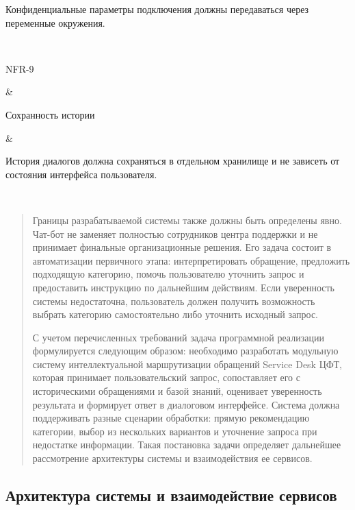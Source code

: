 \documentclass[
]{article}
\begin{document}
\begin{longtable}[]
\begin{minipage}[b]{\linewidth}
Конфиденциальные параметры подключения должны передаваться через
переменные окружения.
\end{minipage} \\
\begin{minipage}[b]{\linewidth}\raggedright
NFR-9
\end{minipage} & \begin{minipage}[b]{\linewidth}\raggedright
Сохранность истории
\end{minipage} & \begin{minipage}[b]{\linewidth}\raggedright
История диалогов должна сохраняться в отдельном хранилище и не зависеть
от состояния интерфейса пользователя.
\end{minipage} \\
\midrule\noalign{}
\endhead
\bottomrule\noalign{}
\endlastfoot
\end{longtable}

\begin{quote}
Границы разрабатываемой системы также должны быть определены явно.
Чат-бот не заменяет полностью сотрудников центра поддержки и не
принимает финальные организационные решения. Его задача состоит в
автоматизации первичного этапа: интерпретировать обращение, предложить
подходящую категорию, помочь пользователю уточнить запрос и предоставить
инструкцию по дальнейшим действиям. Если уверенность системы
недостаточна, пользователь должен получить возможность выбрать категорию
самостоятельно либо уточнить исходный запрос.

С учетом перечисленных требований задача программной реализации
формулируется следующим образом: необходимо разработать модульную
систему интеллектуальной маршрутизации обращений Service Desk ЦФТ,
которая принимает пользовательский запрос, сопоставляет его с
историческими обращениями и базой знаний, оценивает уверенность
результата и формирует ответ в диалоговом интерфейсе. Система должна
поддерживать разные сценарии обработки: прямую рекомендацию категории,
выбор из нескольких вариантов и уточнение запроса при недостатке
информации. Такая постановка задачи определяет дальнейшее рассмотрение
архитектуры системы и взаимодействия ее сервисов.
\end{quote}

\hypertarget{ux430ux440ux445ux438ux442ux435ux43aux442ux443ux440ux430-ux441ux438ux441ux442ux435ux43cux44b-ux438-ux432ux437ux430ux438ux43cux43eux434ux435ux439ux441ux442ux432ux438ux435-ux441ux435ux440ux432ux438ux441ux43eux432}{%
\subsection{Архитектура системы и взаимодействие
сервисов}\label{ux430ux440ux445ux438ux442ux435ux43aux442ux443ux440ux430-ux441ux438ux441ux442ux435ux43cux44b-ux438-ux432ux437ux430ux438ux43cux43eux434ux435ux439ux441ux442ux432ux438ux435-ux441ux435ux440ux432ux438ux441ux43eux432}}
\end{document}
